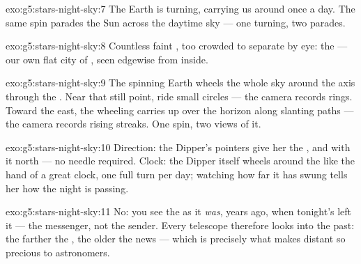 \begin{solution}{exo:g5:stars-night-sky:7}
The Earth is turning, carrying us around once a day. The same spin
parades the Sun across the daytime sky --- one turning, two
parades.
\end{solution}

\begin{solution}{exo:g5:stars-night-sky:8}
Countless faint , too crowded to separate by eye: the  --- our own flat city of , seen edgewise from inside.
\end{solution}

\begin{solution}{exo:g5:stars-night-sky:9}
The spinning Earth wheels the whole sky around the axis through the
. Near that still point,  ride small circles ---
the camera records rings. Toward the east, the wheeling carries
 up over the horizon along slanting paths --- the camera
records rising streaks. One spin, two views of it.
\end{solution}

\begin{solution}{exo:g5:stars-night-sky:10}
Direction: the Dipper's pointers give her the , and with
it north --- no needle required. Clock: the Dipper itself wheels
around the  like the hand of a great clock, one full
turn per day; watching how far it has swung tells her how the
night is passing.
\end{solution}

\begin{solution}{exo:g5:stars-night-sky:11}
No: you see the  as it \emph{was}, years ago, when tonight's
 left it --- the messenger, not the sender. Every telescope
therefore looks into the past: the farther the , the older the
news --- which is precisely what makes distant  so precious
to astronomers.
\end{solution}
